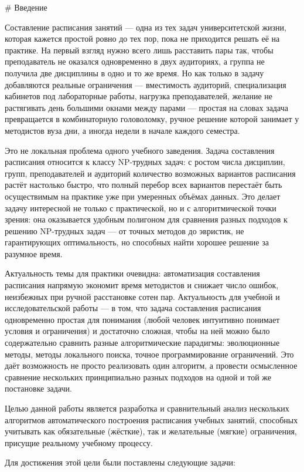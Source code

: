 # Введение

Составление расписания занятий — одна из тех задач университетской жизни, которая кажется простой ровно до тех пор, пока не приходится решать её на практике. На первый взгляд нужно всего лишь расставить пары так, чтобы преподаватель не оказался одновременно в двух аудиториях, а группа не получила две дисциплины в одно и то же время. Но как только в задачу добавляются реальные ограничения — вместимость аудиторий, специализация кабинетов под лабораторные работы, нагрузка преподавателей, желание не растягивать день большими окнами между парами — простая на словах задача превращается в комбинаторную головоломку, ручное решение которой занимает у методистов вуза дни, а иногда недели в начале каждого семестра.

Это не локальная проблема одного учебного заведения. Задача составления расписания относится к классу NP-трудных задач: с ростом числа дисциплин, групп, преподавателей и аудиторий количество возможных вариантов расписания растёт настолько быстро, что полный перебор всех вариантов перестаёт быть осуществимым на практике уже при умеренных объёмах данных. Это делает задачу интересной не только с практической, но и с алгоритмической точки зрения: она оказывается удобным полигоном для сравнения разных подходов к решению NP-трудных задач — от точных методов до эвристик, не гарантирующих оптимальность, но способных найти хорошее решение за разумное время.

Актуальность темы для практики очевидна: автоматизация составления расписания напрямую экономит время методистов и снижает число ошибок, неизбежных при ручной расстановке сотен пар. Актуальность для учебной и исследовательской работы — в том, что задача составления расписания одновременно простая для понимания (любой человек интуитивно понимает условия и ограничения) и достаточно сложная, чтобы на ней можно было содержательно сравнить разные алгоритмические парадигмы: эволюционные методы, методы локального поиска, точное программирование ограничений. Это даёт возможность не просто реализовать один алгоритм, а провести осмысленное сравнение нескольких принципиально разных подходов на одной и той же постановке задачи.

Целью данной работы является разработка и сравнительный анализ нескольких алгоритмов автоматического построения расписания учебных занятий, способных учитывать как обязательные (жёсткие), так и желательные (мягкие) ограничения, присущие реальному учебному процессу.

Для достижения этой цели были поставлены следующие задачи:

